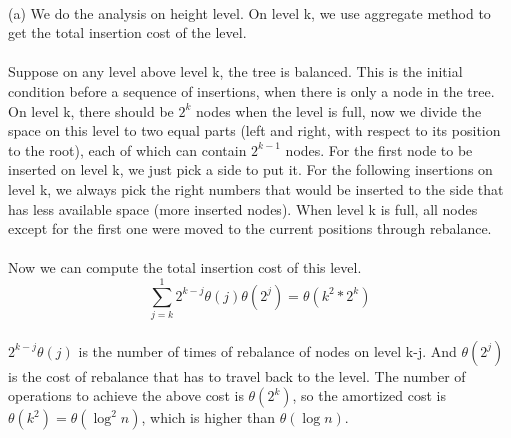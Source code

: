 \begin{problem}{1} ~\\
(a) We do the analysis on height level. On level k, we use aggregate method to get the total insertion cost of the level.\\
\\
Suppose on any level above level k, the tree is balanced. This is the initial condition before a sequence of insertions, when there is only a node in the tree. On level k, there should be $2^k$ nodes when the level is full, now we divide the space on this level to two equal parts (left and right, with respect to its position to the root), each of which can contain $2^{k-1}$ nodes. For the first node to be inserted on level k, we just pick a side to put it. For the following insertions on level k, we always pick the right numbers that would be inserted to the side that has less available space (more inserted nodes). When level k is full, all nodes except for the first one were moved to the current positions through rebalance.\\
\\
Now we can compute the total insertion cost of this level. $$\sum_{j=k}^{1} 2^{k-j}\theta(j)\theta(2^j) = \theta(k^2*2^k)$$\\
$2^{k-j}\theta(j)$ is the number of times of rebalance of nodes on level k-j. And $\theta(2^j)$ is the cost of rebalance that has to travel back to the level. The number of operations to achieve the above cost is $\theta(2^k)$, so the amortized cost is $\theta(k^2) = \theta(\log^2{n})$, which is higher than $\theta(\log{n})$.
\end{problem}